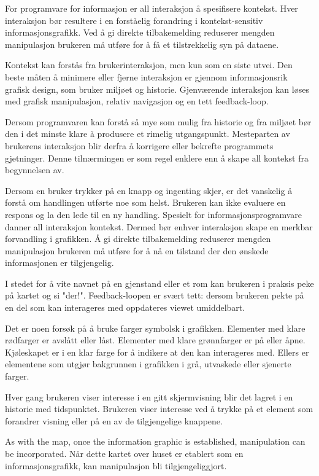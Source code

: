 For programvare for informasjon er all interaksjon å spesifisere kontekst. Hver interaksjon bør resultere i en forståelig forandring i kontekst-sensitiv informasjonsgrafikk. Ved å gi direkte tilbakemelding reduserer mengden manipulasjon brukeren må utføre for å få et tilstrekkelig syn på dataene.

Kontekst kan forstås fra brukerinteraksjon, men kun som en siste utvei. Den beste måten å minimere eller fjerne interaksjon er gjennom informasjonsrik grafisk design, som bruker miljøet og historie. Gjenværende interaksjon kan løses med grafisk manipulasjon, relativ navigasjon og en tett feedback-loop.

Dersom programvaren kan forstå så mye som mulig fra historie og fra miljøet bør den i det minste klare å produsere et rimelig utgangspunkt. Mesteparten av brukerens interaksjon blir derfra å korrigere eller bekrefte programmets gjetninger. Denne tilnærmingen er som regel enklere enn å skape all kontekst fra begynnelsen av.

Dersom en bruker trykker på en knapp og ingenting skjer, er det vanskelig å forstå om handlingen utførte noe som helst. Brukeren kan ikke evaluere en respons og la den lede til en ny handling. Spesielt for informasjonsprogramvare danner all interaksjon kontekst. Dermed bør enhver interaksjon skape en merkbar forvandling i grafikken. Å gi direkte tilbakemelding reduserer mengden manipulasjon brukeren må utføre for å nå en tilstand der den ønskede informasjonen er tilgjengelig.

I stedet for å vite navnet på en gjenstand eller et rom kan brukeren i praksis peke på kartet og si "der!". Feedback-loopen er svært tett: dersom brukeren pekte på en del som kan interageres med oppdateres viewet umiddelbart. 

Det er noen forsøk på å bruke farger symbolsk i grafikken. Elementer med klare rødfarger er avslått eller låst. Elementer med klare grønnfarger er på eller åpne. Kjøleskapet er i en klar farge for å indikere at den kan interageres med. Ellers er elementene som utgjør bakgrunnen i grafikken i grå, utvaskede eller sjenerte farger.

Hver gang brukeren viser interesse i en gitt skjermvisning blir det lagret i en historie med tidspunktet. Brukeren viser interesse ved å trykke på et element som forandrer visning eller på en av de tilgjengelige knappene.

As with the map, once the information graphic is established, manipulation can be incorporated.
Når dette kartet over huset er etablert som en informasjonsgrafikk, kan manipulasjon bli tilgjengeliggjort.

